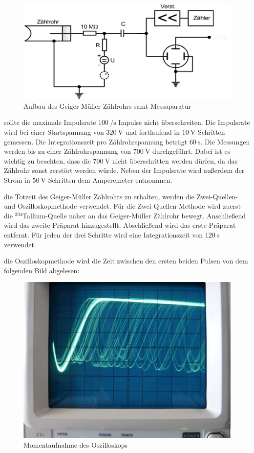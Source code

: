     \begin{figure}[H]
        \centering
        \includegraphics[width=\linewidth]{images/Aufbau.jpg}
        \caption{Aufbau des Geiger-Müller Zählrohrs samt Messaparatur \cite{V703}}
        \label{fig:5}
    \end{figure}

    \justifying sollte die maximale Impulsrate $\SI{100}{\per\second}$ Impulse nicht überschreiten. Die Impulsrate wird
    bei einer Startspannung von $\SI{320}{\volt}$ und fortlaufend in $\SI{10}{\volt}$-Schritten gemessen. Die Integrationszeit pro 
    Zählrohrspannung beträgt $\SI{60}{\second}$. Die Messungen werden bis zu einer Zählrohrspannung von $\SI{700}{\volt}$ durchgeführt. Dabei
    ist es wichtig zu beachten, dass die $\SI{700}{\volt}$ nicht überschritten werden dürfen, da das Zählrohr sonst zerstört werden würde.
    Neben der Impulsrate wird außerdem der Strom in $\SI{50}{\volt}$-Schritten dem Amperemeter entnommen.

    \justifying die Totzeit des Geiger-Müller Zählrohrs zu erhalten, werden die Zwei-Quellen- und Oszilloskopmethode verwendet. 
    Für die Zwei-Quellen-Methode wird zuerst die $^{204}$Tallium-Quelle näher an das Geiger-Müller Zählrohr bewegt. Anschließend wird das zweite 
    Präparat hinzugestellt. Abschließend wird das erste Präparat entfernt. Für jeden der drei Schritte wird eine Integrationszeit von $\SI{120}
    {\second}$ verwendet. 

    \newpage
    \justifying die Oszilloskopmethode wird die Zeit zwischen den ersten beiden Pulsen von dem folgenden Bild abgelesen:

    \begin{figure}[H]
        \centering
        \includegraphics[width=0.75\linewidth]{images/Oszilloskop.jpg}
        \caption{Momentaufnahme des Oszilloskops \cite{V703}}
        \label{fig:6}
    \end{figure}

